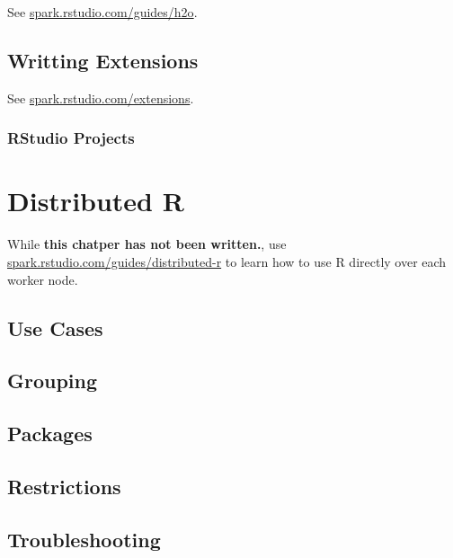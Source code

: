 \documentclass[]{book}
\theoremstyle{definition}
\theoremstyle{definition}
\theoremstyle{definition}
\theoremstyle{remark}
\begin{document}
See
\href{http://spark.rstudio.com/guides/h2o/}{spark.rstudio.com/guides/h2o}.

\hypertarget{writting-extensions}{%
\section{Writting Extensions}\label{writting-extensions}}

See
\href{http://spark.rstudio.com/extensions/}{spark.rstudio.com/extensions}.

\hypertarget{rstudio-projects}{%
\subsection{RStudio Projects}\label{rstudio-projects}}

\hypertarget{distributed}{%
\chapter{Distributed R}\label{distributed}}

While \textbf{this chatper has not been written.}, use
\href{http://spark.rstudio.com/guides/distributed-r/}{spark.rstudio.com/guides/distributed-r}
to learn how to use R directly over each worker node.

\hypertarget{use-cases}{%
\section{Use Cases}\label{use-cases}}

\hypertarget{grouping}{%
\section{Grouping}\label{grouping}}

\hypertarget{packages}{%
\section{Packages}\label{packages}}

\hypertarget{restrictions}{%
\section{Restrictions}\label{restrictions}}

\hypertarget{troubleshooting-2}{%
\section{Troubleshooting}\label{troubleshooting-2}}
\end{document}
